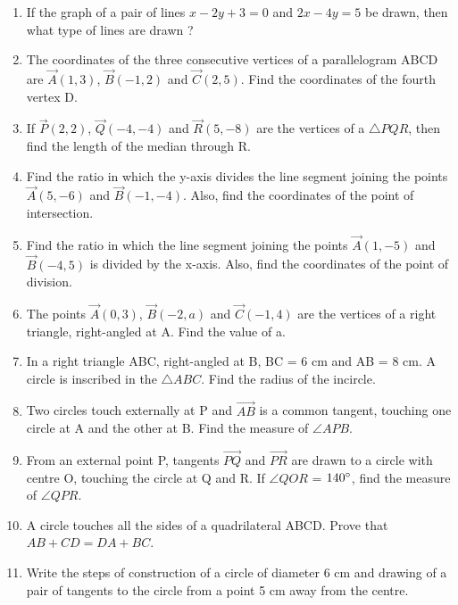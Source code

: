 \documentclass{article}
\begin{document}
\begin{enumerate}
\item If the graph of a pair of lines $x - 2y + 3 = 0$ and $2x - 4y = 5$ be drawn, then what type of lines are drawn ? 
  
\item The coordinates of the three consecutive vertices of a parallelogram ABCD are $\vec{A}(1, 3)$, $\vec{B}(-1, 2)$ and $\vec{C}(2, 5)$. Find the coordinates of the fourth vertex D. 

\item If $\vec{P}(2, 2)$, $\vec{Q}(-4, -4)$ and $\vec{R}(5, -8)$ are the vertices of a  $\triangle PQR$, then find the length of the median through R.

\item Find the ratio in which the y-axis divides the line segment joining the points $\vec{A}(5, -6)$ and $\vec{B}(-1, -4)$. Also, find the coordinates of the point of intersection.

\item Find the ratio in which the line segment joining the points $\vec{A}(1, -5)$ and $\vec{B}(-4, 5)$ is divided by the x-axis. Also, find the coordinates of the point of division.
   
\item The points $\vec{A}(0, 3)$, $\vec{B}(-2, a)$ and $\vec{C}(-1, 4)$ are the vertices of a right triangle, right-angled at A. Find the value of a. 
		
\item In a right triangle ABC, right-angled at B, BC = 6 cm and AB = 8 cm. A circle is inscribed in the $\triangle ABC$. Find the radius of the incircle. 
			
\item Two circles touch externally at P and $ \vec{AB} $ is a common tangent, touching one circle at A and the other at B. Find the measure of $\angle APB$.

\item From an external point P, tangents $ \vec{PQ} $ and $ \vec{PR} $ are drawn to a circle with centre O, touching the circle at Q and R. If $\angle QOR$ = $140\degree$, find the measure of $\angle QPR$. 

\item A circle touches all the sides of a quadrilateral ABCD. Prove that $AB + CD = DA + BC$.

\item Write the steps of construction of a circle of diameter 6 cm and drawing of a pair of tangents to the circle from a point 5 cm away from the centre. 
		
\end{enumerate}	
\end{document}

